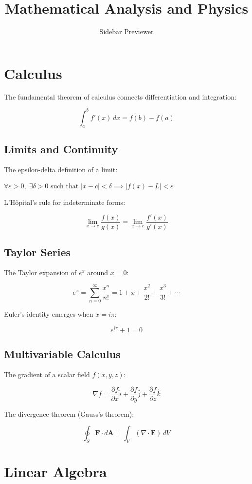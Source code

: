 \documentclass{article}
\title{Mathematical Analysis and Physics}
\author{Sidebar Previewer}
\begin{document}
\maketitle

\section{Calculus}

The fundamental theorem of calculus connects differentiation and integration:

$$\int_a^b f'(x)\,dx = f(b) - f(a)$$

\subsection{Limits and Continuity}

The epsilon-delta definition of a limit:

$\forall \varepsilon > 0,\;\exists \delta > 0$ such that $|x - c| < \delta \implies |f(x) - L| < \varepsilon$

L'Hôpital's rule for indeterminate forms:

$$\lim_{x \to c} \frac{f(x)}{g(x)} = \lim_{x \to c} \frac{f'(x)}{g'(x)}$$

\subsection{Taylor Series}

The Taylor expansion of $e^x$ around $x=0$:

$$e^x = \sum_{n=0}^{\infty} \frac{x^n}{n!} = 1 + x + \frac{x^2}{2!} + \frac{x^3}{3!} + \cdots$$

Euler's identity emerges when $x = i\pi$:

$$e^{i\pi} + 1 = 0$$

\subsection{Multivariable Calculus}

The gradient of a scalar field $f(x, y, z)$:

$$\nabla f = \frac{\partial f}{\partial x}\hat{i} + \frac{\partial f}{\partial y}\hat{j} + \frac{\partial f}{\partial z}\hat{k}$$

The divergence theorem (Gauss's theorem):

$$\oint_S \mathbf{F} \cdot d\mathbf{A} = \int_V (\nabla \cdot \mathbf{F})\,dV$$

\section{Linear Algebra}
\end{document}
